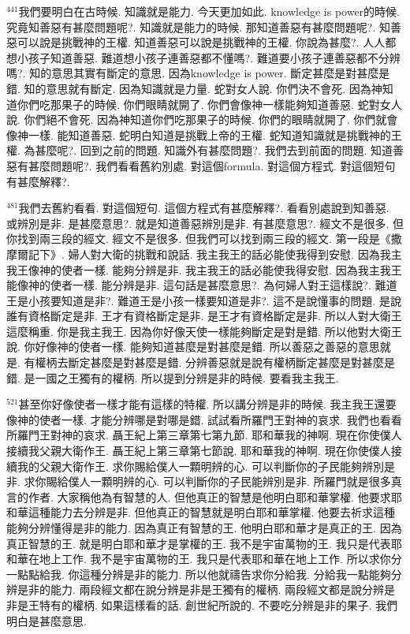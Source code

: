 \documentclass{book}
\begin{document}
$^{441}$我們要明白在古時候.
知識就是能力.
今天更加如此.
knowledge is power的時候.
究竟知善惡有甚麼問題呢?.
知識就是能力的時候.
那知道善惡有甚麼問題呢?.
知善惡可以說是挑戰神的王權.
知道善惡可以說是挑戰神的王權.
你說為甚麼?.
人人都想小孩子知道善惡.
難道想小孩子連善惡都不懂嗎?.
難道要小孩子連善惡都不分辨嗎?.
知的意思其實有斷定的意思.
因為knowledge is power.
斷定甚麼是對甚麼是錯.
知的意思就有斷定.
因為知識就是力量.
蛇對女人說.
你們決不會死.
因為神知道你們吃那果子的時候.
你們眼睛就開了.
你們會像神一樣能夠知道善惡.
蛇對女人說.
你們絕不會死.
因為神知道你們吃那果子的時候.
你們的眼睛就開了.
你們就會像神一樣.
能知道善惡.
蛇明白知道是挑戰上帝的王權.
蛇知道知識就是挑戰神的王權.
為甚麼呢?.
回到之前的問題.
知識外有甚麼問題?.
我們去到前面的問題.
知道善惡有甚麼問題呢?.
我們看看舊約別處.
對這個formula.
對這個方程式.
對這個短句有甚麼解釋?.

$^{481}$我們去舊約看看.
對這個短句.
這個方程式有甚麼解釋?.
看看別處說到知善惡.
或辨別是非.
是甚麼意思?.
就是知道善惡辨別是非.
有甚麼意思?.
經文不是很多.
但你找到兩三段的經文.
經文不是很多.
但我們可以找到兩三段的經文.
第一段是《撒摩爾記下》.
婦人對大衛的挑戰和說話.
我主我王的話必能使我得到安慰.
因為我主我王像神的使者一樣.
能夠分辨是非.
我主我王的話必能使我得安慰.
因為我主我王能像神的使者一樣.
能分辨是非.
這句話是甚麼意思?.
為何婦人對王這樣說?.
難道王是小孩要知道是非?.
難道王是小孩一樣要知道是非?.
這不是說懂事的問題.
是說誰有資格斷定是非.
王才有資格斷定是非.
是王才有資格斷定是非.
所以人對大衛王這麼稱重.
你是我主我王.
因為你好像天使一樣能夠斷定是對是錯.
所以他對大衛王說.
你好像神的使者一樣.
能夠知道甚麼是對甚麼是錯.
所以善惡之善惡的意思就是.
有權柄去斷定甚麼是對甚麼是錯.
分辨善惡就是說有權柄斷定甚麼是對甚麼是錯.
是一國之王獨有的權柄.
所以提到分辨是非的時候.
要看我主我王.

$^{521}$甚至你好像使者一樣才能有這樣的特權.
所以講分辨是非的時候.
我主我王還要像神的使者一樣.
才能分辨哪是對哪是錯.
試試看所羅門王對神的哀求.
我們也看看所羅門王對神的哀求.
聶王紀上第三章第七第九節.
耶和華我的神啊.
現在你使僕人接續我父親大衛作王.
聶王紀上第三章第七節說.
耶和華我的神啊.
現在你使僕人接續我的父親大衛作王.
求你賜給僕人一顆明辨的心.
可以判斷你的子民能夠辨別是非.
求你賜給僕人一顆明辨的心.
可以判斷你的子民能辨別是非.
所羅門就是很多真言的作者.
大家稱他為有智慧的人.
但他真正的智慧是他明白耶和華掌權.
他要求耶和華這種能力去分辨是非.
但他真正的智慧就是明白耶和華掌權.
他要去祈求這種能夠分辨懂得是非的能力.
因為真正有智慧的王.
他明白耶和華才是真正的王.
因為真正智慧的王.
就是明白耶和華才是掌權的王.
我不是宇宙萬物的王.
我只是代表耶和華在地上工作.
我不是宇宙萬物的王.
我只是代表耶和華在地上工作.
所以求你分一點點給我.
你這種分辨是非的能力.
所以他就禱告求你分給我.
分給我一點能夠分辨是非的能力.
兩段經文都在說分辨是非是王獨有的權柄.
兩段經文都是說分辨是非是王特有的權柄.
如果這樣看的話.
創世紀所說的.
不要吃分辨是非的果子.
我們明白是甚麼意思.
\end{document}
